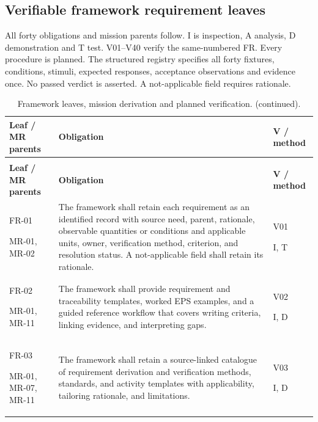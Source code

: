 \subsection{Verifiable framework requirement leaves}
\label{subsection:framework-requirements}

All forty obligations and mission parents follow. I is inspection, A analysis, D demonstration and T test. V01--V40 verify the same-numbered FR. Every procedure is planned. The structured registry specifies all forty fixtures, conditions, stimuli, expected responses, acceptance observations and evidence once. No passed verdict is asserted. A not-applicable field requires rationale.
{\small
\setlength{\tabcolsep}{4pt}
\setlength{\parskip}{0pt}
\setlength{\LTpre}{0.4\baselineskip}
\setlength{\LTpost}{0.4\baselineskip}
\renewcommand{\arraystretch}{1.06}
\begin{longtable}{@{}>{\raggedright\arraybackslash}p{}>{\raggedright\arraybackslash}p{}>{\raggedright\arraybackslash}p{}@{}}
\caption{Framework leaves, mission derivation and planned verification.}\label{tab:framework-requirements}\\
\toprule
\textbf{Leaf / MR parents} & \textbf{Obligation} & \textbf{V / method} \\
\midrule
\endfirsthead
\caption[]{Framework leaves, mission derivation and planned verification. (continued).}\\
\toprule
\textbf{Leaf / MR parents} & \textbf{Obligation} & \textbf{V / method} \\
\midrule
\endhead
\bottomrule
\endfoot
FR-01\par MR-01, MR-02 & The framework shall retain each requirement as an identified record with source need, parent, rationale, observable quantities or conditions and applicable units, owner, verification method, criterion, and resolution status. A not-applicable field shall retain its rationale. & V01\par I, T \\
FR-02\par MR-01, MR-11 & The framework shall provide requirement and traceability templates, worked EPS examples, and a guided reference workflow that covers writing criteria, linking evidence, and interpreting gaps. & V02\par I, D \\
FR-03\par MR-01, MR-07, MR-11 & The framework shall retain a source-linked catalogue of requirement derivation and verification methods, standards, and activity templates with applicability, tailoring rationale, and limitations. & V03\par I, D \\

\end{longtable}}
